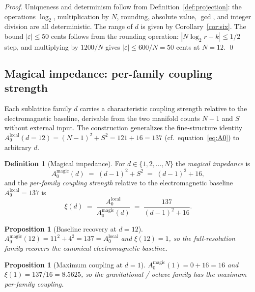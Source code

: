 \documentclass[11pt,a4paper]{article}
\newtheorem{proposition}[theorem]{Proposition}
\theoremstyle{definition}
\newtheorem{definition}[theorem]{Definition}
\theoremstyle{remark}
\newcommand{\eps}{\varepsilon}
\begin{document}
\begin{proof}
Uniqueness and determinism follow from Definition~\ref{def:projection}: the operations $\log_{2}$, multiplication by $N$, rounding, absolute value, $\gcd$, and integer division are all deterministic. The range of $d$ is given by Corollary~\ref{cor:six}. The bound $|\eps|\le 50$ cents follows from the rounding operation: $|N\log_{2}r - k|\le 1/2$ step, and multiplying by $1200/N$ gives $|\eps|\le 600/N=50$ cents at $N=12$. \qed
\end{proof}

\subsection{Magical impedance: per-family coupling strength}\label{subsec:impedance}

Each sublattice family $d$ carries a characteristic coupling strength relative to the electromagnetic baseline, derivable from the two manifold counts $N{-}1$ and $S$ without external input. The construction generalizes the fine-structure identity $A_{0}^{\text{local}}(d{=}12) = (N{-}1)^{2}+S^{2} = 121+16 = 137$ (cf.\ equation~\eqref{eq:A0}) to arbitrary $d$.

\begin{definition}[Magical impedance]\label{def:magical-impedance}
For $d\in\{1,2,\ldots,N\}$ the \emph{magical impedance} is
\[
A_{0}^{\text{magic}}(d) \;=\; (d-1)^{2} + S^{2} \;=\; (d-1)^{2} + 16,
\]
and the \emph{per-family coupling strength} relative to the electromagnetic baseline $A_{0}^{\text{local}} = 137$ is
\[
\xi(d) \;=\; \frac{A_{0}^{\text{local}}}{A_{0}^{\text{magic}}(d)} \;=\; \frac{137}{(d-1)^{2}+16}.
\]
\end{definition}

\begin{proposition}[Baseline recovery at $d=12$]\label{prop:baseline}
$A_{0}^{\text{magic}}(12) = 11^{2}+4^{2} = 137 = A_{0}^{\text{local}}$ and $\xi(12) = 1$, so the full-resolution family recovers the canonical electromagnetic baseline.
\end{proposition}

\begin{proposition}[Maximum coupling at $d=1$]\label{prop:max-coupling}
$A_{0}^{\text{magic}}(1) = 0 + 16 = 16$ and $\xi(1) = 137/16 = 8.5625$, so the gravitational / octave family has the maximum per-family coupling.
\end{proposition}
\end{document}
